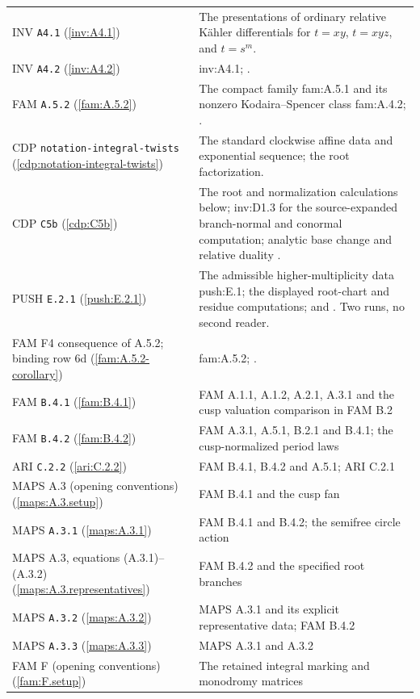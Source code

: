 \documentclass[11pt,a4paper]{article}
\theoremstyle{plain}
\theoremstyle{definition}
\begin{document}
\begin{longtable}{@{}L{.21\linewidth}L{.73\linewidth}@{}}
INV \nolinkurl{A4.1} (\ref{inv:A4.1}) & The presentations of ordinary relative Kähler differentials for $t=xy$, $t=xyz$, and $t=s^m$.\\
INV \nolinkurl{A4.2} (\ref{inv:A4.2}) & inv:A4.1; \cite[Remarks 1.3 and 9.21]{AC26}.\\
FAM \nolinkurl{A.5.2} (\ref{fam:A.5.2}) & The compact family fam:A.5.1 and its nonzero Kodaira--Spencer class fam:A.4.2; \cite[Theorems 1.3 and 6.12]{DGKXv1}.\\
CDP \nolinkurl{notation-integral-twists} (\ref{cdp:notation-integral-twists}) & The standard clockwise affine data and exponential sequence; the root factorization.\\
CDP \nolinkurl{C5b} (\ref{cdp:C5b}) & The root and normalization calculations below; inv:D1.3 for the source-expanded branch-normal and conormal computation; analytic base change \cite[III.4.10, III.4.12]{BS76} and relative duality \cite{RRV71}.\\
PUSH \nolinkurl{E.2.1} (\ref{push:E.2.1}) & The admissible higher-multiplicity data push:E.1; the displayed root-chart and residue computations; \cite[III.4.12]{BS76} and \cite{RRV71}. Two runs, no second reader.\\
FAM F4 consequence of A.5.2; binding row 6d (\ref{fam:A.5.2-corollary}) & fam:A.5.2; \cite[Theorem 9.1(i)]{AC26}.\\
FAM \nolinkurl{B.4.1} (\ref{fam:B.4.1}) & FAM A.1.1, A.1.2, A.2.1, A.3.1 and the cusp valuation comparison in FAM B.2\\
FAM \nolinkurl{B.4.2} (\ref{fam:B.4.2}) & FAM A.3.1, A.5.1, B.2.1 and B.4.1; the cusp-normalized period laws\\
ARI \nolinkurl{C.2.2} (\ref{ari:C.2.2}) & FAM B.4.1, B.4.2 and A.5.1; ARI C.2.1\\
MAPS A.3 (opening conventions) (\ref{maps:A.3.setup}) & FAM B.4.1 and the cusp fan\\
MAPS \nolinkurl{A.3.1} (\ref{maps:A.3.1}) & FAM B.4.1 and B.4.2; the semifree circle action\\
MAPS A.3, equations (A.3.1)--(A.3.2) (\ref{maps:A.3.representatives}) & FAM B.4.2 and the specified root branches\\
MAPS \nolinkurl{A.3.2} (\ref{maps:A.3.2}) & MAPS A.3.1 and its explicit representative data; FAM B.4.2\\
MAPS \nolinkurl{A.3.3} (\ref{maps:A.3.3}) & MAPS A.3.1 and A.3.2\\
FAM F (opening conventions) (\ref{fam:F.setup}) & The retained integral marking and monodromy matrices\\

\end{longtable}
\end{document}
